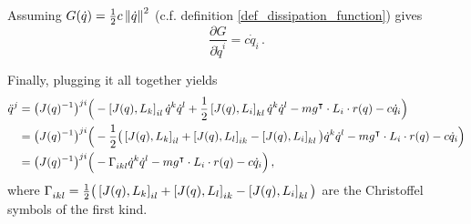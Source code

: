 Assuming $G(\dot{q}) = \frac{1}{2} c \left\Vert \dot{q} \right\Vert^2$ (c.f. definition \ref{def_dissipation_function}) gives
\begin{equation*}
    \frac{\partial G}{\partial \dot{q}^i} = c \dot{q}_i \,.
\end{equation*}

Finally, plugging it all together yields
\begin{align*}
    \ddot{q}^j
        &= \big( J(q)^{-1} \big)\indices{^j^i} \Big(
            -\com{J(q)}{L_k}\indices{_i_l} \dot{q}^k \dot{q}^l
            +\frac{1}{2} \com{J(q)}{L_i}\indices{_k_l} \dot{q}^k \dot{q}^l
            -m g^\transpose \cdot L_i \cdot r(q)
            -c \dot{q}_i
        \Big) \\
        &= \big( J(q)^{-1} \big)\indices{^j^i} \Big(
            -\frac{1}{2} \big( \com{J(q)}{L_k}\indices{_i_l} + \com{J(q)}{L_l}\indices{_i_k} - \com{J(q)}{L_i}\indices{_k_l} \big) \dot{q}^k \dot{q}^l
            -m g^\transpose \cdot L_i \cdot r(q)
            -c \dot{q}_i
        \Big) \\
        &= \big( J(q)^{-1} \big)\indices{^j^i} \Big(
            -\Ga\indices{_i_k_l} \dot{q}^k \dot{q}^l
            -m g^\transpose \cdot L_i \cdot r(q)
            -c \dot{q}_i
        \Big) \,,
\end{align*}
where $\Ga\indices{_i_k_l} = \frac{1}{2} \big( \com{J(q)}{L_k}\indices{_i_l} + \com{J(q)}{L_l}\indices{_i_k} - \com{J(q)}{L_i}\indices{_k_l} \big)$ are the Christoffel symbols of the first kind.





